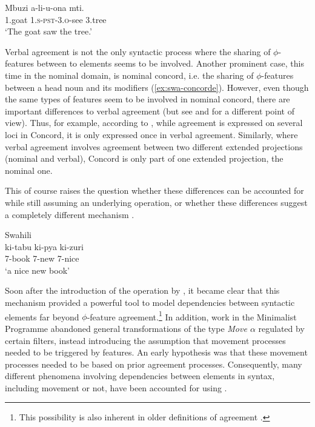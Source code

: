 \documentclass[output=paper
,modfonts
,nonflat]{langsci/langscibook}
\begin{document}
\begin{exe}
	\ex \label{ex:swa-subj-obj} 
	\gll Mbuzi a-li-u-ona mti.\\
	1.goat \textsc{1.s-pst-3.o}-see 3.tree\\
	\glt `The goat saw the tree.'
	
\end{exe}
Verbal agreement is not the only syntactic process where the sharing of $\phi$-features between to elements seems to be involved.
Another prominent case, this time in the nominal domain, is nominal concord, i.e. the sharing of $\phi$-features between a head noun and its modifiers (\ref{ex:swa-concorde}).
However, even though the same types of features seem to be involved in nominal concord, there are important differences to verbal agreement (but see \citealt{Carstens2001} and \citealt{Baker2008a} for a different point of view). Thus, for example, according to \citet[][7]{Norris2014}, while agreement is expressed on several loci in Concord, it is only expressed once in verbal agreement. Similarly, where verbal agreement involves agreement between two different extended projections (nominal and verbal), Concord is only part of one extended projection, the nominal one.

This of course raises the question whether these differences can be accounted for while still assuming an underlying \agr{} operation, or whether these differences suggest a completely different mechanism \citep{Norris2014}.
\begin{exe}
	\ex Swahili \label{ex:swa-concorde}\\
	\gll ki-tabu ki-pya ki-zuri\\
	7-book 7-new 7-nice\\
	\glt `a nice new book'
	
\end{exe}
Soon after the introduction of the {\agr} operation by \citet{Chomsky2000,Chomsky2001}, it became clear that this mechanism provided a powerful tool to model dependencies between syntactic elements far beyond $\phi$-feature agreement.\footnote{This possibility is also inherent in older definitions of agreement \citep{steel1978,kayne1989}.}
In addition, work in the Minimalist Programme abandoned general transformations of the type \textit{Move $\alpha$} regulated by certain filters, instead introducing the assumption that movement processes needed to be triggered by features.
An early hypothesis was that these  movement processes needed to be based on prior agreement processes.
Consequently, many different phenomena involving dependencies between elements in syntax, including movement or not, have been accounted for using \agr.
\end{document}
